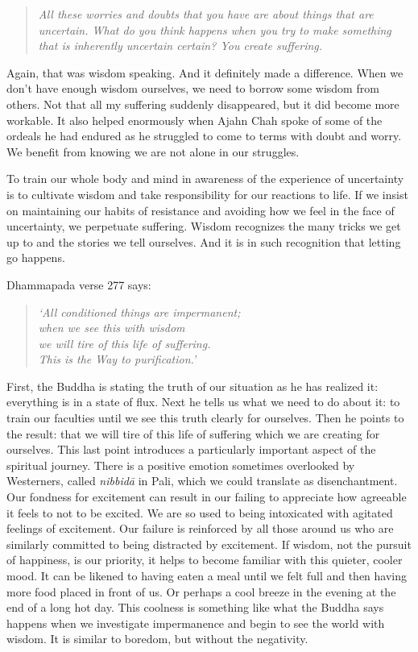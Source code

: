 \begin{quote}
\itshape
All these worries and doubts that you have are about things that are
uncertain. What do you think happens when you try to make something that is
inherently uncertain certain? You create suffering.
\end{quote}

Again, that was wisdom speaking. And it definitely made a difference. When we
don't have enough wisdom ourselves, we need to borrow some wisdom from others.
Not that all my suffering suddenly disappeared, but it did become more workable.
It also helped enormously when Ajahn Chah spoke of some of the ordeals he had
endured as he struggled to come to terms with doubt and worry. We benefit from
knowing we are not alone in our struggles.

To train our whole body and mind in awareness of the experience of
uncertainty is to cultivate wisdom and take responsibility for our
reactions to life. If we insist on maintaining our habits of resistance
and avoiding how we feel in the face of uncertainty, we perpetuate
suffering. Wisdom recognizes the many tricks we get up to and the
stories we tell ourselves. And it is in such recognition that letting go
happens.

\clearpage

Dhammapada verse 277 says:

\begin{quote}
{\itshape `All conditioned things are impermanent;\\
when we see this with wisdom\\
we will tire of this life of suffering.\\
This is the Way to purification.'}\thinspace \cite{dhammapada}
\end{quote}

First, the Buddha is stating the truth of our situation as he has
realized it: everything is in a state of flux. Next he tells us what we
need to do about it: to train our faculties until we see this truth
clearly for ourselves. Then he points to the result: that we will tire
of this life of suffering which we are creating for ourselves. This last
point introduces a particularly important aspect of the spiritual
journey. There is a positive emotion sometimes overlooked by
Westerners, called \emph{nibbidā} in Pali, which we could translate as
disenchantment. Our fondness for excitement can result in our failing to
appreciate how agreeable it feels to not to be excited. We are so used
to being intoxicated with agitated feelings of excitement. Our failure
is reinforced by all those around us who are similarly committed to
being distracted by excitement. If wisdom, not the pursuit of happiness,
is our priority, it helps to become familiar with this quieter, cooler
mood. It can be likened to having eaten a meal until we felt full and
then having more food placed in front of us. Or perhaps a cool breeze in
the evening at the end of a long hot day. This coolness is something
like what the Buddha says happens when we investigate impermanence and
begin to see the world with wisdom. It is similar to boredom, but
without the negativity.

